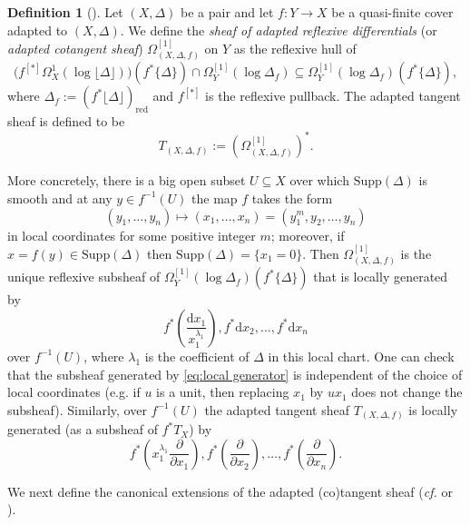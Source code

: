 \documentclass[12pt]{amsart}
\theoremstyle{definition}
\newtheorem{defn}[prop]{Definition}
\newcommand{\rd}{\mathrm{d}}
\newcommand{\Supp}{\mathrm{Supp}}
\numberwithin{equation}{section}
\begin{document}
\begin{defn}[{\cite[Definition 3.11]{CKT-hyperbolicity}}]
Let $(X,\Delta)$ be a pair and let $f\colon Y \to X$ be a quasi-finite cover adapted to $(X,\Delta)$. %
We define the \emph{sheaf of adapted reflexive differentials} (or \emph{adapted cotangent sheaf}) $\Omega^{[1]}_{(X,\Delta,f)}$ on $Y$ as the reflexive hull of 
\[
\big(f^{[*]}\Omega_X^{1}(\log \lfloor \Delta\rfloor)\big)(f^*\{\Delta\}) \cap \Omega^{[1]}_Y(\log \Delta_f) \subseteq \Omega^{[1]}_Y(\log \Delta_f)(f^*\{\Delta\}),
\]
where $\Delta_f:=(f^*\lfloor\Delta\rfloor)_{\mathrm{red}}$ and $f^{[*]}$ is the reflexive pullback. The adapted tangent sheaf is defined to be 
\[
T_{(X,\Delta,f)}:=\left(\Omega^{[1]}_{(X,\Delta,f)}\right)^* .
\]

More concretely, there is a big open subset $U\subseteq X$ over which $\Supp(\Delta)$ is smooth and at any $y\in f^{-1}(U)$ the map $f$ takes the form
\[
(y_1,\dots,y_n)\mapsto (x_1,\dots,x_n)=(y_1^m,y_2,\dots,y_n)
\]
in local coordinates for some positive integer $m$; moreover, if $x=f(y)\in \Supp(\Delta)$ then $\Supp(\Delta) = \{x_1=0\}$. Then $\Omega^{[1]}_{(X,\Delta,f)}$ is the unique reflexive subsheaf of $\Omega^{[1]}_Y(\log \Delta_f)(f^*\{\Delta\})$ that is locally generated by
\begin{equation} \label{eq:local generator}
f^*\left(\frac{\rd x_1}{x_1^{\lambda_1}}\right), f^*\rd x_2,\dots,f^*\rd x_n
\end{equation}
over $f^{-1}(U)$, where $\lambda_1$ is the coefficient of $\Delta$ in this local chart. One can check that the subsheaf generated by \eqref{eq:local generator} is independent of the choice of local coordinates (e.g. if $u$ is a unit, then replacing $x_1$ by $ux_1$ does not change the subsheaf). Similarly, over $f^{-1}(U)$ the adapted tangent sheaf $T_{(X,\Delta,f)}$ is locally generated (as a subsheaf of $f^*T_X$) by
\[
f^*\left(x_1^{\lambda_1}\frac{\partial}{\partial x_1}\right), f^*\left(\frac{\partial}{\partial x_2}\right),\dots,f^*\left(\frac{\partial}{\partial x_n}\right).
\]
\end{defn}
 
We next define the canonical extensions of the adapted (co)tangent sheaf ({\it cf.} \cite[Section 2.3]{Li-extension-stab} or \cite[Section 2.2.2]{Dai-MY}).
\end{document}
